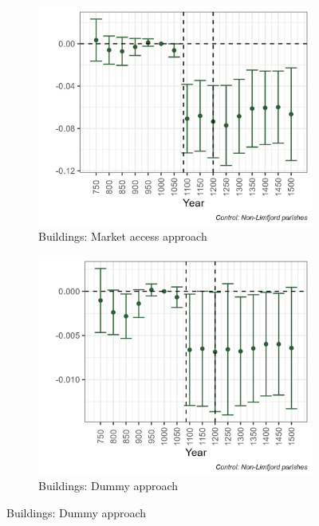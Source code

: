 \documentclass[11pt]{article}
\begin{document}
\begin{figure}
\begin{subfigure}[b]{0.45\textwidth}
    \end{subfigure}
    \vspace{0.45cm}
    \begin{subfigure}[b]{0.45\textwidth}
        \centering
        \caption{Buildings: Market access approach} \label{fig:arch1c}
        \includegraphics[width=\textwidth]{Plots/Regression_plots/arch_MA_buildings.png}
    \end{subfigure}
    \hfill
    \begin{subfigure}[b]{0.45\textwidth}
        \centering
        \caption{Buildings: Dummy approach} \label{fig:arch1d}
        \includegraphics[width=\textwidth]{Plots/Regression_plots/arch_dummy_buildings.png}

\end{subfigure}
\end{figure}
\end{document}
